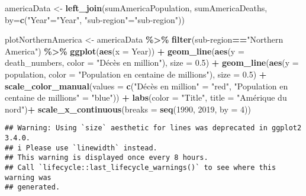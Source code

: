 \documentclass[
]{article}
\newenvironment{Shaded}{\begin{snugshade}}{\end{snugshade}}
\newcommand{\AttributeTok}[1]{\textcolor[rgb]{0.13,0.29,0.53}{#1}}
\newcommand{\DecValTok}[1]{\textcolor[rgb]{0.00,0.00,0.81}{#1}}
\newcommand{\FloatTok}[1]{\textcolor[rgb]{0.00,0.00,0.81}{#1}}
\newcommand{\FunctionTok}[1]{\textcolor[rgb]{0.13,0.29,0.53}{\textbf{#1}}}
\newcommand{\NormalTok}[1]{#1}
\newcommand{\OtherTok}[1]{\textcolor[rgb]{0.56,0.35,0.01}{#1}}
\newcommand{\SpecialCharTok}[1]{\textcolor[rgb]{0.81,0.36,0.00}{\textbf{#1}}}
\newcommand{\StringTok}[1]{\textcolor[rgb]{0.31,0.60,0.02}{#1}}
\begin{document}
\begin{Shaded}
\begin{Highlighting}[]
\NormalTok{americaData }\OtherTok{\textless{}{-}} \FunctionTok{left\_join}\NormalTok{(sumAmericaPopulation, sumAmericaDeaths, }\AttributeTok{by=}\FunctionTok{c}\NormalTok{(}\StringTok{"Year"}\OtherTok{=}\StringTok{"Year"}\NormalTok{, }\StringTok{"sub{-}region"}\OtherTok{=}\StringTok{"sub{-}region"}\NormalTok{))}

\NormalTok{plotNorthernAmerica }\OtherTok{\textless{}{-}}\NormalTok{ americaData }\SpecialCharTok{\%\textgreater{}\%}
  \FunctionTok{filter}\NormalTok{(}\StringTok{\textasciigrave{}}\AttributeTok{sub{-}region}\StringTok{\textasciigrave{}}\SpecialCharTok{==}\StringTok{"Northern America"}\NormalTok{) }\SpecialCharTok{\%\textgreater{}\%}
  \FunctionTok{ggplot}\NormalTok{(}\FunctionTok{aes}\NormalTok{(}\AttributeTok{x =}\NormalTok{ Year)) }\SpecialCharTok{+} 
  \FunctionTok{geom\_line}\NormalTok{(}\FunctionTok{aes}\NormalTok{(}\AttributeTok{y =}\NormalTok{ death\_numbers, }\AttributeTok{color =} \StringTok{"Décès en million"}\NormalTok{), }\AttributeTok{size =} \FloatTok{0.5}\NormalTok{) }\SpecialCharTok{+}
  \FunctionTok{geom\_line}\NormalTok{(}\FunctionTok{aes}\NormalTok{(}\AttributeTok{y =}\NormalTok{ population, }\AttributeTok{color =} \StringTok{"Population en centaine de millions"}\NormalTok{), }\AttributeTok{size =} \FloatTok{0.5}\NormalTok{) }\SpecialCharTok{+}
  \FunctionTok{scale\_color\_manual}\NormalTok{(}\AttributeTok{values =} \FunctionTok{c}\NormalTok{(}\StringTok{"Décès en million"} \OtherTok{=} \StringTok{"red"}\NormalTok{, }\StringTok{"Population en centaine de millions"} \OtherTok{=} \StringTok{"blue"}\NormalTok{)) }\SpecialCharTok{+}
  \FunctionTok{labs}\NormalTok{(}\AttributeTok{color =} \StringTok{"Title"}\NormalTok{, }\AttributeTok{title =} \StringTok{"Amérique du nord"}\NormalTok{)}\SpecialCharTok{+}
  \FunctionTok{scale\_x\_continuous}\NormalTok{(}\AttributeTok{breaks =} \FunctionTok{seq}\NormalTok{(}\DecValTok{1990}\NormalTok{, }\DecValTok{2019}\NormalTok{, }\AttributeTok{by =} \DecValTok{4}\NormalTok{))}
\end{Highlighting}
\end{Shaded}

\begin{verbatim}
## Warning: Using `size` aesthetic for lines was deprecated in ggplot2 3.4.0.
## i Please use `linewidth` instead.
## This warning is displayed once every 8 hours.
## Call `lifecycle::last_lifecycle_warnings()` to see where this warning was
## generated.
\end{verbatim}
\end{document}
